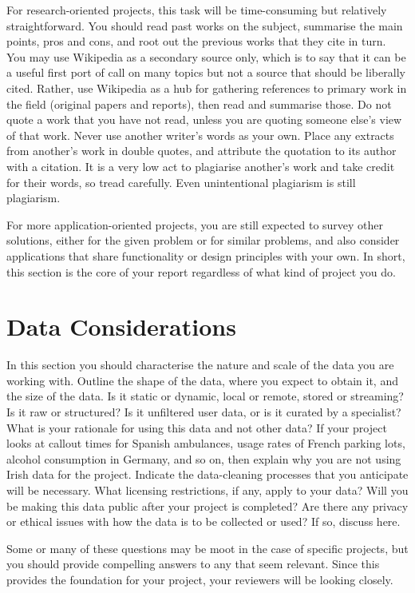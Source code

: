 \documentclass[]{UCD_CS_FYP_Report}
\begin{document}
For research-oriented projects, this task will be time-consuming but relatively straightforward. You should read past works on the subject, summarise the main points, pros and cons, and root out the previous works that they cite in turn. You may use Wikipedia as a secondary source only, which is to say that it can be a useful first port of call on many topics but not a source that should be liberally cited. Rather, use Wikipedia as a hub for gathering references to primary work in the field (original papers and reports), then read and summarise those. Do not quote a work that you have not read, unless you are quoting someone else’s view of that work. Never use another writer’s words as your own. Place any extracts from another’s work in double quotes, and attribute the quotation to its author with a citation. It is a very low act to plagiarise another’s work and take credit for their words, so tread carefully. Even unintentional plagiarism is still plagiarism.

For more application-oriented projects, you are still expected to survey other solutions, either for the given problem or for similar problems, and also consider applications that share functionality or design principles with your own. In short, this section is the core of your report regardless of what kind of project you do.

\chapter{Data Considerations}
In this section you should characterise the nature and scale of the data you are working with. Outline the shape of the data, where you expect to obtain it, and the size of the data. Is it static or dynamic, local or remote, stored or streaming? Is it raw or structured? Is it unfiltered user data, or is it curated by a specialist? What is your rationale for using this data and not other data? If your project looks at callout times for Spanish ambulances, usage rates of French parking lots, alcohol consumption in Germany, and so on, then explain why you are not using Irish data for the project. Indicate the data-cleaning processes that you anticipate will be necessary. What licensing restrictions, if any, apply to your data? Will you be making this data public after your project is completed? Are there any privacy or ethical issues with how the data is to be collected or used? If so, discuss here.

Some or many of these questions may be moot in the case of specific projects, but you should provide compelling answers to any that seem relevant. Since this provides the foundation for your project, your reviewers will be looking closely.
\end{document}
